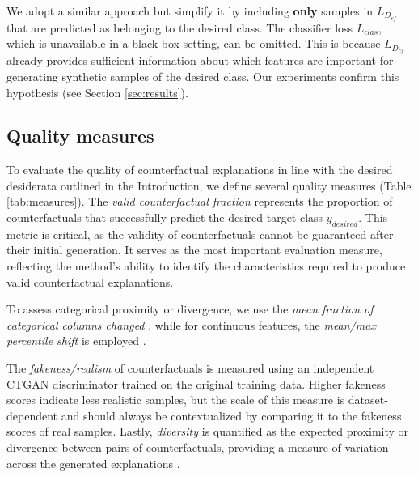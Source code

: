 \documentclass[runningheads]{llncs}
\begin{document}
We adopt a similar approach but simplify it by including \textbf{only} samples in \( L_{D_{cf}} \) that are predicted as belonging to the desired class. The classifier loss \( L_{clas} \), which is unavailable in a black-box setting, can be omitted. This is because \( L_{D_{cf}} \) already provides sufficient information about which features are important for generating synthetic samples of the desired class. Our experiments confirm this hypothesis (see Section \ref{sec:results}).

\subsection{Quality measures}
\label{subsec:quality measures}
To evaluate the quality of counterfactual explanations in line with the desired desiderata outlined in the Introduction, we define several quality measures (Table \ref{tab:measures}). The \textit{valid counterfactual fraction} represents the proportion of counterfactuals that successfully predict the desired target class \(y_{desired}\). This metric is critical, as the validity of counterfactuals cannot be guaranteed after their initial generation. It serves as the most important evaluation measure, reflecting the method's ability to identify the characteristics required to produce valid counterfactual explanations. 

To assess categorical proximity or divergence, we use the \textit{mean fraction of categorical columns changed} \cite{mothilal2020explaining}, while for continuous features, the \textit{mean/max percentile shift}  is employed \cite{pawelczyk2020learning}. 

The \textit{fakeness/realism} of counterfactuals is measured using an independent CTGAN discriminator trained on the original training data. Higher fakeness scores indicate less realistic samples, but the scale of this measure is dataset-dependent and should always be contextualized by comparing it to the fakeness scores of real samples. Lastly, \textit{diversity} is quantified as the expected proximity or divergence between pairs of counterfactuals, providing a measure of variation across the generated explanations \cite{mothilal2020explaining}.

\clearpage
\end{document}
